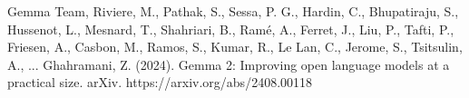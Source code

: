 \documentclass[licencjacka,en]{pracamgr}
\begin{document}
\begin{thebibliography}{99}
Gemma Team, Riviere, M., Pathak, S., Sessa, P. G., Hardin, C., Bhupatiraju, S., Hussenot, L., Mesnard, T., Shahriari, B., Ramé, A., Ferret, J., Liu, P., Tafti, P., Friesen, A., Casbon, M., Ramos, S., Kumar, R., Le Lan, C., Jerome, S., Tsitsulin, A., ... Ghahramani, Z. (2024). Gemma 2: Improving open language models at a practical size. arXiv. https://arxiv.org/abs/2408.00118
\end{thebibliography}
\end{document}
